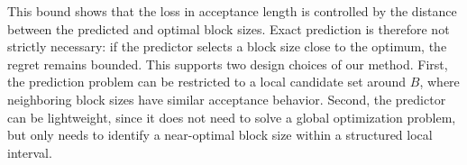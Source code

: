 \documentclass{llmxive}
\begin{document}
This bound shows that the loss in acceptance length is controlled by the distance between the predicted and optimal block sizes. Exact prediction is therefore not strictly necessary: if the predictor selects a block size close to the optimum, the regret remains bounded. This supports two design choices of our method. First, the prediction problem can be restricted to a local candidate set around $B$, where neighboring block sizes have similar acceptance behavior. Second, the predictor can be lightweight, since it does not need to solve a global optimization problem, but only needs to identify a near-optimal block size within a structured local interval.









\end{document}

